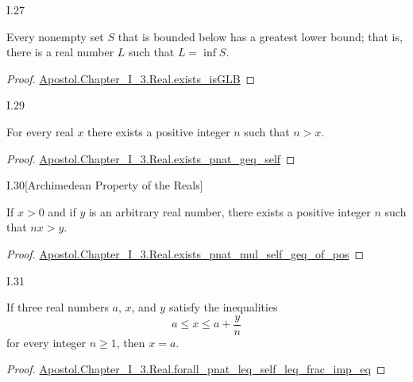 \documentclass{article}
\begin{document}
\begin{xtheorem}{I.27}

Every nonempty set $S$ that is bounded below has a greatest lower bound;
that is, there is a real number $L$ such that $L = \inf{S}$.

\end{xtheorem}

\begin{proof}

\href{Chapter_I_3.lean}{Apostol.Chapter_I_3.Real.exists_isGLB}

\end{proof}

\begin{xtheorem}{I.29}

For every real $x$ there exists a positive integer $n$ such that $n > x$.

\end{xtheorem}

\begin{proof}

\href{Chapter_I_3.lean}{Apostol.Chapter_I_3.Real.exists_pnat_geq_self}

\end{proof}

\begin{xtheorem}{I.30}[Archimedean Property of the Reals]

If $x > 0$ and if $y$ is an arbitrary real number, there exists a positive integer $n$ such that $nx > y$.

\end{xtheorem}

\begin{proof}

\href{Chapter_I_3.lean}{Apostol.Chapter_I_3.Real.exists_pnat_mul_self_geq_of_pos}

\end{proof}

\begin{xtheorem}{I.31}

If three real numbers $a$, $x$, and $y$ satisfy the inequalities
$$a \leq x \leq a + \frac{y}{n}$$
for every integer $n \geq 1$, then $x = a$.

\end{xtheorem}

\begin{proof}

\href{Chapter_I_3.lean}{Apostol.Chapter_I_3.Real.forall_pnat_leq_self_leq_frac_imp_eq}

\end{proof}
\end{document}
